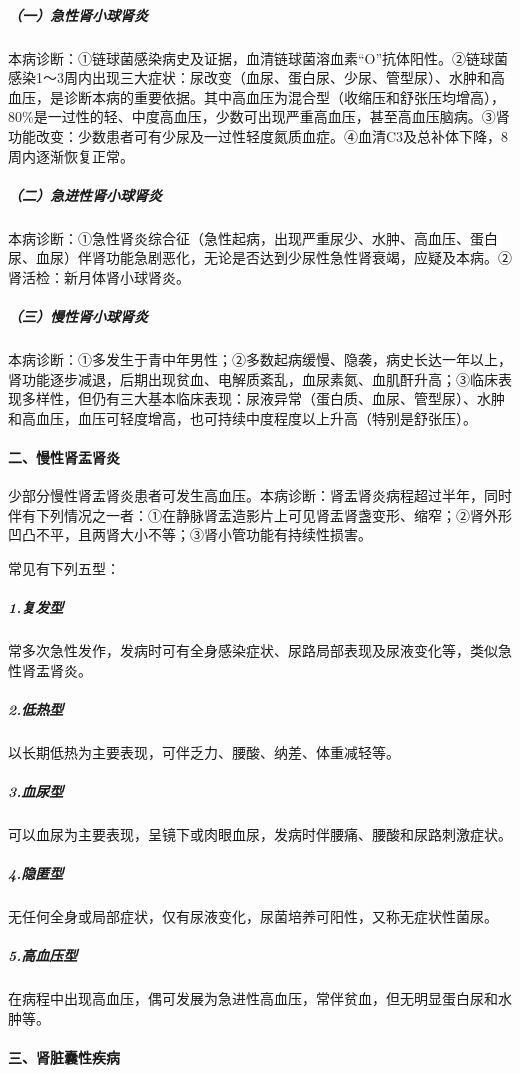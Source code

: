 \subparagraph{（一）急性肾小球肾炎}

本病诊断：①链球菌感染病史及证据，血清链球菌溶血素“O”抗体阳性。②链球菌感染1～3周内出现三大症状：尿改变（血尿、蛋白尿、少尿、管型尿）、水肿和高血压，是诊断本病的重要依据。其中高血压为混合型（收缩压和舒张压均增高），80\%是一过性的轻、中度高血压，少数可出现严重高血压，甚至高血压脑病。③肾功能改变：少数患者可有少尿及一过性轻度氮质血症。④血清C3及总补体下降，8周内逐渐恢复正常。

\subparagraph{（二）急进性肾小球肾炎}

本病诊断：①急性肾炎综合征（急性起病，出现严重尿少、水肿、高血压、蛋白尿、血尿）伴肾功能急剧恶化，无论是否达到少尿性急性肾衰竭，应疑及本病。②肾活检：新月体肾小球肾炎。

\subparagraph{（三）慢性肾小球肾炎}

本病诊断：①多发生于青中年男性；②多数起病缓慢、隐袭，病史长达一年以上，肾功能逐步减退，后期出现贫血、电解质紊乱，血尿素氮、血肌酐升高；③临床表现多样性，但仍有三大基本临床表现：尿液异常（蛋白质、血尿、管型尿）、水肿和高血压，血压可轻度增高，也可持续中度程度以上升高（特别是舒张压）。

\paragraph{二、慢性肾盂肾炎}

少部分慢性肾盂肾炎患者可发生高血压。本病诊断：肾盂肾炎病程超过半年，同时伴有下列情况之一者：①在静脉肾盂造影片上可见肾盂肾盏变形、缩窄；②肾外形凹凸不平，且两肾大小不等；③肾小管功能有持续性损害。

常见有下列五型：

\subparagraph{1.复发型}

常多次急性发作，发病时可有全身感染症状、尿路局部表现及尿液变化等，类似急性肾盂肾炎。

\subparagraph{2.低热型}

以长期低热为主要表现，可伴乏力、腰酸、纳差、体重减轻等。

\subparagraph{3.血尿型}

可以血尿为主要表现，呈镜下或肉眼血尿，发病时伴腰痛、腰酸和尿路刺激症状。

\subparagraph{4.隐匿型}

无任何全身或局部症状，仅有尿液变化，尿菌培养可阳性，又称无症状性菌尿。

\subparagraph{5.高血压型}

在病程中出现高血压，偶可发展为急进性高血压，常伴贫血，但无明显蛋白尿和水肿等。

\paragraph{三、肾脏囊性疾病}

